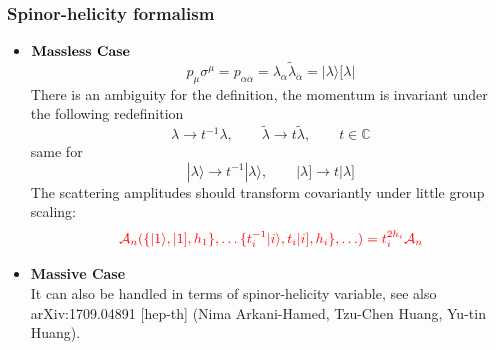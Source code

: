 \documentclass{beamer}
\newcommand{\aket}[1]{|#1\rangle}
\newcommand{\sket}[1]{|#1]}
\begin{document}
\begin{frame}
\frametitle{Spinor-helicity formalism}
    \begin{itemize}
        \item $\textbf{\text{Massless Case}}$\\
    \begin{equation*}
        p_\mu \sigma^\mu=p_{\alpha\dot{\alpha}}=\lambda_\alpha \tilde{\lambda}_{\dot{\alpha}}=\aket{\lambda}[\lambda|
    \end{equation*}
    There is an ambiguity for the definition, the momentum is invariant under the following redefinition
    \begin{equation*}
        \lambda \rightarrow t^{-1}\lambda, \qquad \tilde{\lambda}\rightarrow t\tilde{\lambda}, \qquad t\in\mathbb{C} 
    \end{equation*}
    same for
    \begin{equation*}
        \aket{\lambda}\rightarrow t^{-1}\aket{\lambda}, \qquad \sket{\lambda}\rightarrow t\sket{\lambda}
    \end{equation*}
    The scattering amplitudes should transform covariantly under little group scaling:
    \begin{equation*}
        \color{red} \mathcal{A}_n(\{\aket{1},\sket{1},h_1\},\ldots\{t_i^{-1}\aket{i},t_i\sket{i},h_i\},\ldots )=t_i^{2h_i}\mathcal{A}_n
    \end{equation*}
    \end{itemize}
\vspace{-2em}
    \begin{itemize}
    \item \textbf{Massive Case}\\
    It can also be handled in terms of spinor-helicity variable, see also 	arXiv:1709.04891 [hep-th] (Nima Arkani-Hamed, Tzu-Chen Huang, Yu-tin Huang).
    \end{itemize}
\end{frame}
\end{document}
